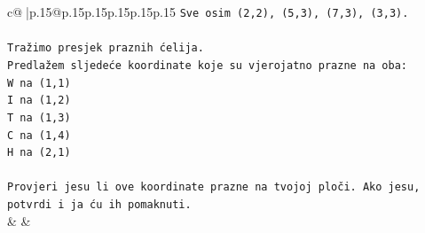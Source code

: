 \documentclass{article}
\begin{document}
{\begin{supertabular}{c@{$\;$}|p{.15\linewidth}@{}p{.15\linewidth}p{.15\linewidth}p{.15\linewidth}p{.15\linewidth}p{.15\linewidth}}
{{{\texttt{Sve osim (2,2), (5,3), (7,3), (3,3).} \\
\\ 
\texttt{Tražimo presjek praznih ćelija.} \\
\texttt{Predlažem sljedeće koordinate koje su vjerojatno prazne na oba:} \\
\texttt{W na (1,1)} \\
\texttt{I na (1,2)} \\
\texttt{T na (1,3)} \\
\texttt{C na (1,4)} \\
\texttt{H na (2,1)} \\
\\ 
\texttt{Provjeri jesu li ove koordinate prazne na tvojoj ploči. Ako jesu, potvrdi i ja ću ih pomaknuti.} \\
            }
        }
    }
    & & \\ \\


\end{supertabular}}
\end{document}
